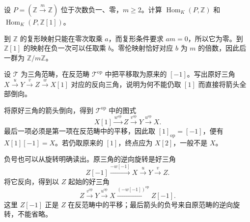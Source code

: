 \begin{exercise}\label{b4:ex:16-homotopy-limits}
	设 \(P=(\mathbb Z\xrightarrow{m}\mathbb Z)\) 位于次数负一、零，\(m\ge2\)。计算 \(\operatorname{Hom}_K(P,\mathbb Z)\) 和 \(\operatorname{Hom}_K(P,\mathbb Z[1])\)。
\end{exercise}
\begin{solution}
	到 \(\mathbb Z\) 的复形映射只能在零次取乘 \(a\)，而复形条件要求 \(am=0\)，所以它为零。到 \(\mathbb Z[1]\) 的映射在负一次可以任取乘 \(b\)。零伦映射恰好对应 \(b\) 为 \(m\) 的倍数，因此后一群为 \(\mathbb Z/m\mathbb Z\)。
\end{solution}

\begin{exercise}\label{b4:ex:16-opposite-shift}
	设 \(\mathcal T\) 为三角范畴，在反范畴 \(\mathcal T^{\mathrm{op}}\) 中把平移取为原来的 \([-1]\)。写出原好三角 \(X\xrightarrow{u}Y\xrightarrow{v}Z\xrightarrow{w}X[1]\) 对应的反向三角，说明为何不能仍取 \([1]\) 而直接将箭头全部倒向。
\end{exercise}
\begin{solution}
	将原好三角的箭头倒向，得到 \(\mathcal T^{\mathrm{op}}\) 中的图式
	\[
		X[1]\xrightarrow{w^{\mathrm{op}}}Z \xrightarrow{v^{\mathrm{op}}}Y \xrightarrow{u^{\mathrm{op}}}X.
	\]
	最后一项必须是第一项在反范畴中的平移，因此取 \([1]_{\mathrm{op}}=[-1]\)，便有 \(X[1][-1]=X\)。若仍取原来的 \([1]\)，终点应为 \(X[2]\)，一般不是 \(X\)。

	负号也可以从旋转明确读出。原三角的逆向旋转是好三角
	\[
		Z[-1]\xrightarrow{-w[-1]}X\xrightarrow{u}Y\xrightarrow{v}Z.
	\]
	将它反向，得到以 \(Z\) 起始的好三角
	\[
		Z\xrightarrow{v^{\mathrm{op}}}Y \xrightarrow{u^{\mathrm{op}}}X \xrightarrow{(-w[-1])^{\mathrm{op}}}Z[-1].
	\]
	这里 \(Z[-1]\) 正是 \(Z\) 在反范畴中的平移；最后箭头的负号来自原范畴的逆向旋转，不能省略。
\end{solution}

